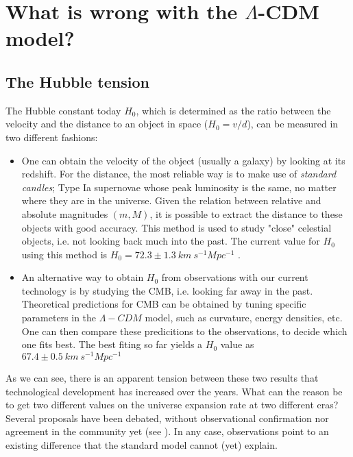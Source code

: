 \documentclass[11pt, a4paper]{article} %
\begin{document}
\section*{What is wrong with the $\Lambda$-CDM model?}


\subsection*{The Hubble tension}

The Hubble constant today $H_{0}$, which is determined as the ratio between the velocity and the distance to an object in space ($H_{0} = v/d$), can be measured in two different fashions:

\begin{itemize}
	\item One can obtain the velocity of the object (usually a galaxy) by looking at its redshift. For the distance, the most reliable way is to make use of \textit{standard candles}; Type Ia supernovae whose peak luminosity is the same, no matter where they are in the universe. Given the relation between relative and absolute magnitudes $(m, M)$, it is possible to extract the distance to these objects with good accuracy. This method is used to study "close" celestial objects, i.e. not looking back much into the past. The current value for $H_{0}$ using this method is $H_{0} = 72.3 \pm 1.3 \: km \:s^{-1} Mpc^{-1}$ \cite{2020planck}.
	
	\item An alternative way to obtain $H_{0}$ from observations with our current technology is by studying the CMB, i.e. looking far away in the past. Theoretical predictions for CMB can be obtained by tuning specific parameters in the $\Lambda- CDM$ model, such as curvature, energy densities, etc. One can then compare these predicitions to the observations, to decide which one fits best. The best fiting so far yields a $H_{0}$ value as $67.4 \pm 0.5 \: km \:s^{-1} Mpc^{-1}$ \cite{Riess_2021}
\end{itemize}

As we can see, there is an apparent tension between these two results that technological development has increased over the years. What can the reason be to get two different values on the universe expansion rate at two different eras? Several proposals have been debated, without observational confirmation nor agreement in the community yet (see \cite{di2021realm}). In any case, observations point to an existing difference that the standard model cannot (yet) explain.
\end{document}
